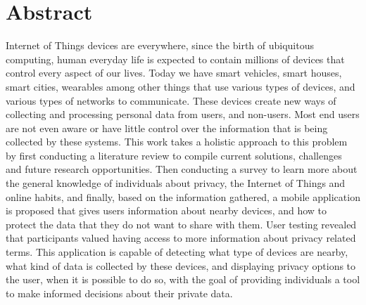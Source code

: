 %
%
\chapter*{Abstract}
\justify

Internet of Things devices are everywhere, since the birth of ubiquitous
computing, human everyday life is expected to contain millions of
devices that control every aspect of our lives. Today we have smart vehicles,
smart houses, smart cities, wearables among other things that use various
types of devices, and various types of networks to communicate. These devices
create new ways of collecting and processing personal data from users, and
non-users. Most end users are not even aware or have little control over
the information that is being collected by these systems. This work takes
a holistic approach to this problem by first conducting a literature review
to compile current solutions, challenges and future research opportunities.
Then conducting a survey to learn more about the general knowledge of
individuals about privacy, the Internet of Things and online habits, and finally, based on the
information gathered, a mobile application is proposed that gives users
information about nearby devices, and how
to protect the data that they do not want to share with them.
User testing revealed that participants valued having access to more
information about privacy related terms. This
application is capable of detecting what type of devices are nearby, what kind
of data is collected by these devices, and displaying privacy options to the user,
when it is possible to do so, with the goal of providing individuals a tool to make
informed decisions about their private data.

